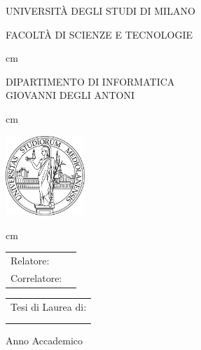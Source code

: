 \begin{titlepage}

\begin{center}
	{\LARGE \uppercase{Università degli Studi di Milano}}

	\uppercase{Facoltà di Scienze e Tecnologie}

	 cm
	
	\uppercase{Dipartimento di Informatica\\Giovanni Degli Antoni}

	 cm
	
	\centerline{\includegraphics[height=30mm]{immagini/unimi}}
	
	 cm
	
	\Large\uppercase{\myCDL}

	\vfill

	{\Large\uppercase\expandafter{\myTitle}}
\end{center}

\vfill
		
\begin{tabular}{ll}
	{\large Relatore:} & \myRefereeA\\
	{\large Correlatore:} & \myRefereeB\\
\end{tabular}	

\vfill

\begin{flushright}
	\begin{tabular}{l}
		{\large Tesi di Laurea di:}\\
		{\large \myName}\\
		{\large \myMat}\\
	\end{tabular}	
\end{flushright}
	
\vspace*{\fill}

\begin{center}
	Anno Accademico \myYY
\end{center}

\end{titlepage}